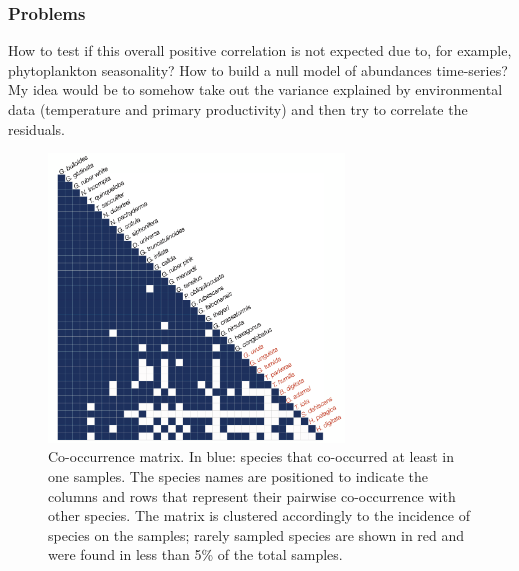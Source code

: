 \subsubsection{Problems} 
How to test if this overall positive correlation is not expected due to, for example, phytoplankton seasonality? How to build a null model of abundances time-series? My idea would be to somehow take out the variance explained by environmental data (temperature and primary productivity) and then try to correlate the residuals.

\begin{figure}
\centering
\includegraphics[width=0.7\textwidth]{traps_co-occur.png}
\caption{\label{fig:co-occur} Co-occurrence matrix. In blue: species that co-occurred at least in one samples. The species names are positioned to indicate the columns and rows that represent their pairwise co-occurrence with other species. The matrix is clustered accordingly to the incidence of species on the samples; rarely sampled species are shown in red and were found in less than 5\% of the total samples.}
\end{figure}

